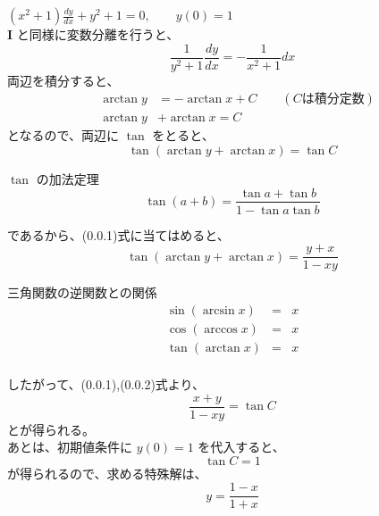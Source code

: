 \documentclass[dvipdfmx,uplatex]{jsarticle}
\begin{document}
\begin{spacing}{1.6}
\begin{qparts}
    \qpart $ \displaystyle (x^2 + 1)\frac{dy}{dx} + y ^ 2 + 1 = 0, \qquad y(0) = 1 $ \\
    {\bf I} と同様に変数分離を行うと、\\
    \begin{equation*}
      \frac{1}{y ^ 2 + 1} \frac{dy}{dx} = - \frac{1}{x ^ 2 + 1}dx
    \end{equation*}
    両辺を積分すると、\\
    \begin{eqnarray*}
      & \arctan y & = - \arctan x + C \qquad (Cは積分定数) \\
      & \arctan y & + \arctan x = C
    \end{eqnarray*}
    となるので、両辺に $ \tan $ をとると、\\
    \begin{equation}
      \tan (\arctan y + \arctan x) = \tan C
    \end{equation}
    \begin{itembox}{$ \tan $ の加法定理}
      \begin{equation*}
        \tan(a + b) = \frac{\tan a + \tan b}{1 - \tan a \tan b}
      \end{equation*}
    \end{itembox}
    であるから、(0.0.1)式に当てはめると、\\
    \begin{equation}
      \tan (\arctan y + \arctan x) = \frac{y + x}{1 - xy}
    \end{equation}
    \begin{itembox}[l]{三角関数の逆関数との関係}
      \begin{eqnarray*}
        \sin(\arcsin x) & = & x \\
        \cos(\arccos x) & = & x \\
        \tan(\arctan x) & = & x \\
      \end{eqnarray*}
    \end{itembox}
    したがって、(0.0.1),(0.0.2)式より、\\
    \begin{equation*}
      \frac{x + y}{1 - xy} = \tan C
    \end{equation*}
    とが得られる。\\
    あとは、初期値条件に $ y(0) = 1 $ を代入すると、
    \begin{equation*}
      \tan C = 1
    \end{equation*}
    が得られるので、求める特殊解は、\\
    \begin{equation*}
      y = \frac{1 - x}{1 + x}
    \end{equation*}
  \end{qparts}
\end{spacing}
\end{document}
